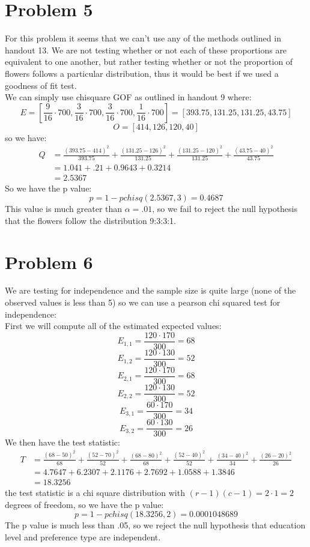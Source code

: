 \documentclass{article}
\begin{document}
\section*{Problem 5}
For this problem it seems that we can't use any of the methods outlined in handout 13. We are not testing whether or not each of these proportions are equivalent to one another, but rather testing whether or not the proportion of flowers follows a particular distribution, thus it would be best if we used a goodness of fit test. \\
We can simply use chisquare GOF as outlined in handout 9 where: \\
\[
E = [\frac{9}{16} \cdot 700, \frac{3}{16} \cdot 700, \frac{3}{16} \cdot 700, \frac{1}{16} \cdot 700] = [393.75, 131.25, 131.25, 43.75]
\]
\[
O = [414, 126, 120, 40]
\]
so we have: \\
\begin{align*}
Q &= \frac{(393.75 - 414)^2}{393.75} + \frac{(131.25- 126)^2}{131.25} + \frac{(131.25- 120)^2}{131.25} + \frac{(43.75- 40)^2}{43.75} \\
&= 1.041 + .21 + 0.9643 + 0.3214 \\
&= 2.5367
\end{align*}
So we have the p value: \\
\[
p = 1 - pchisq(2.5367, 3) = 0.4687
\]
This value is much greater than $\alpha = .01$, so we fail to reject the null hypothesis that the flowers follow the distribution 9:3:3:1. \\
\section*{Problem 6}
We are testing for independence and the sample size is quite large (none of the observed values is less than 5) so we can use a pearson chi squared test for independence: \\
First we will compute all of the estimated expected values: \\
\[
E_{1, 1} = \frac{120 \cdot 170}{300} = 68
\]
\[
E_{1, 2} = \frac{120 \cdot 130}{300} = 52
\]
\[
E_{2, 1} = \frac{120 \cdot 170}{300} = 68
\]
\[
E_{2, 2} = \frac{120 \cdot 130}{300} = 52
\]
\[
E_{3, 1} = \frac{60 \cdot 170}{300} = 34
\]
\[
E_{3,2} = \frac{60 \cdot 130}{300} = 26
\]
We then have the test statistic: \\
\begin{align*}
T &= \frac{(68 - 50)^2}{68} + \frac{(52 - 70)^2}{52} + \frac{(68 - 80)^2}{68} + \frac{(52 - 40)^2}{52} + \frac{(34 - 40)^2}{34} + \frac{(26 - 20)^2}{26} \\
&= 4.7647 + 6.2307 + 2.1176 + 2.7692 + 1.0588 + 1.3846 \\
&= 18.3256
\end{align*}
the test statistic is a chi square distribution with $(r - 1)(c - 1) = 2 \cdot 1 = 2$ degrees of freedom, so we have the p value: \\
\[
p = 1 - pchisq(18.3256, 2) = 0.0001048689
\]
The p value is much less than .05, so we reject the null hypothesis that education level and preference type are independent. \\
\end{document}
